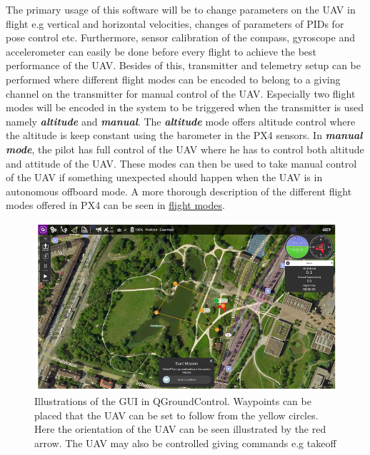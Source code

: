 \documentclass[../Head/report.tex]{subfiles}
\begin{document}
The primary usage of this software will be to change parameters on the UAV in flight e.g vertical and horizontal velocities, changes of parameters of PIDs for pose control etc. Furthermore, sensor calibration of the compass, gyroscope and accelerometer can easily be done before every flight to achieve the best performance of the UAV. Besides of this, transmitter and telemetry setup can be performed where different flight modes can be encoded to belong to a giving channel on the transmitter for manual control of the UAV. Especially two flight modes will be encoded in the system to be triggered when the transmitter is used namely \textit{\textbf{altitude}} and \textit{\textbf{manual}}. The \textit{\textbf{altitude}} mode offers altitude control where the altitude is keep constant using the barometer in the PX4 sensors. In \textit{\textbf{manual mode}}, the pilot has full control of the UAV where he has to control both altitude and attitude of the UAV. These modes can then be used to take manual control of the UAV if something unexpected should happen when the UAV is in autonomous offboard mode. A more thorough description of the different flight modes offered in PX4 can be seen in \href{https://docs.px4.io/v1.9.0/en/flight_modes/}{flight modes}.

\begin{figure}[H]
    \centering
    \includegraphics[width=0.7\linewidth]{../Figures/qgroundcontrol.png}
    \caption{Illustrations of the GUI in QGroundControl. Waypoints can be placed that the UAV can be set to follow from the yellow circles. Here the orientation of the UAV can be seen illustrated by the red arrow. The UAV may also be controlled giving commands e.g takeoff}
    \label{fig:qgroundcontrol}
\end{figure}
\end{document}
